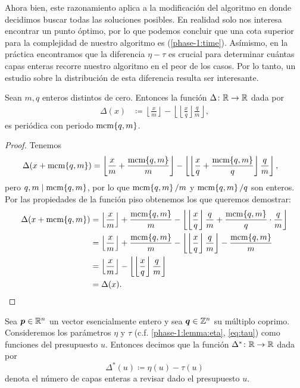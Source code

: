 Ahora bien, este razonamiento aplica a la modificación del algoritmo en donde decidimos buscar todas
las soluciones posibles. En realidad solo nos interesa encontrar un punto óptimo, por lo que podemos
concluir que una cota superior para la complejidad de nuestro algoritmo es (\ref{phase-1:time}).
Asímismo, en la práctica encontramos que la diferencia $\eta - \tau$ es crucial para determinar
cuántas capas enteras recorre nuestro algoritmo en el peor de los casos. Por lo tanto, un estudio
sobre la distribución de esta diferencia resulta ser interesante.
\begin{lemma}
	\label{lemma:layer-dist}
	Sean $m, q$ enteros distintos de cero. Entonces la función $\Delta \colon \mathbb{R} \to \mathbb{R}$ dada por
	\begin{align*}
		\Delta(x) &\coloneq \left\lfloor \frac{x}{m} \right\rfloor - \left\lfloor \left\lfloor
		\frac{x}{q} \right\rfloor \frac{q}{m} \right\rfloor,
	\end{align*}
	es periódica con periodo $\mathop{\mathrm{mcm}{\left\lbrace q, m \right\rbrace}}$.
\end{lemma}
\begin{proof}
	Tenemos
	\begin{align*}
		\Delta(x + \mathop{\mathrm{mcm}{\left\lbrace q, m \right\rbrace}})
		&= \left\lfloor \frac{x}{m} + \frac{\mathop{\mathrm{mcm}{\left\lbrace q, m \right\rbrace}}}{m} \right\rfloor
		- \left\lfloor \left\lfloor \frac{x}{q} + \frac{\mathop{\mathrm{mcm}{\left\lbrace q,m \right\rbrace}}}{q} \right\rfloor \frac{q}{m}
			\right\rfloor,
	\end{align*}
	pero $q, m \mid \mathop{\mathrm{mcm}{\left\lbrace q, m \right\rbrace}}$, por lo que $\mathop{\mathrm{mcm}{\left\lbrace q,m \right\rbrace}}/m$ y $\mathop{\mathrm{mcm}{\left\lbrace q,m \right\rbrace}}/q$ son enteros. Por las
	propiedades de la función piso obtenemos los que queremos demostrar:
	\begin{align*}
		\Delta(x + \mathop{\mathrm{mcm}{\left\lbrace q,m \right\rbrace}})
		&=
		\left\lfloor \frac{x}{m} \right\rfloor + \frac{\mathop{\mathrm{mcm}{\left\lbrace q,m \right\rbrace}}}{m}
		- \left\lfloor \left\lfloor \frac{x}{q} \right\rfloor\frac{q}{m} + 
			\frac{\mathop{\mathrm{mcm}{\left\lbrace q,m \right\rbrace}}}{q}\cdot\frac{q}{m} \right\rfloor \\
		&= 
		\left\lfloor \frac{x}{m} \right\rfloor + \frac{\mathop{\mathrm{mcm}{\left\lbrace q,m \right\rbrace}}}{m}
		- \left\lfloor \left\lfloor \frac{x}{q} \right\rfloor\frac{q}{m}\right\rfloor
		- \frac{\mathop{\mathrm{mcm}{\left\lbrace q,m \right\rbrace}}}{m} \\
		&= 
		\left\lfloor \frac{x}{m} \right\rfloor
		- \left\lfloor \left\lfloor \frac{x}{q} \right\rfloor\frac{q}{m}\right\rfloor \\
		&= \Delta(x).
	\end{align*}
\end{proof}
\begin{definition}
	Sea $\boldsymbol{p} \in \mathbb{R}^n$ un vector esencialmente entero y sea $\boldsymbol{q} \in \mathbb{Z}^n$ su múltiplo
	coprimo. Consideremos los parámetros $\eta$ y $\tau$ (c.f. \ref{phase-1:lemma:eta},
	\ref{eq:tau}) como funciones del presupuesto $u$. Entonces decimos que la función $\Delta^*
	\colon \mathbb{R} \to \mathbb{R}$ dada por
	\begin{equation}
		\label{eq:dist-layers}
		\Delta^*(u) \coloneq \eta(u) - \tau(u)
	\end{equation}
	denota el número de capas enteras a revisar dado el presupuesto $u$.
\end{definition}

